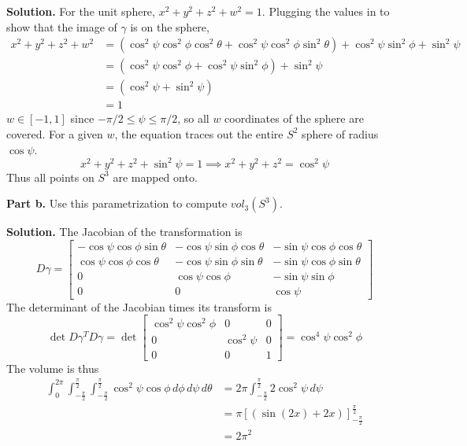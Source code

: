 \documentclass[12pt]{article}
\begin{document}
\textbf{Solution.}
  For the unit sphere, $x^2 + y^2 + z^2 + w^2 = 1$.
  Plugging the values in to show that the image of $\gamma$ is on the sphere, 
  \begin{align*}
    x^2 + y^2 + z^2 + w^2
    &= (\cos^2 \psi \cos^2 \phi \cos^2 \theta + \cos^2 \psi \cos^2 \phi \sin^2 \theta) + \cos^2 \psi \sin^2 \phi + \sin^2 \psi \\
    &= (\cos^2 \psi \cos^2 \phi  + \cos^2 \psi \sin^2 \phi) + \sin^2 \psi \\
    &= (\cos^2 \psi  + \sin^2 \psi) \\
    &= 1
  \end{align*}
   $w \in [-1, 1]$ since $-\pi/2\leq \psi\leq \pi/2$,
  so all $w$ coordinates of the sphere are covered.
  For a given $w$, the equation traces out 
  the entire $S^2$ sphere of radius $\cos \psi$.
  \[
    x^2 + y^2 + z^2 + \sin^2 \psi = 1 
    \implies x^2 + y^2 + z^2 = \cos^2 \psi
  \]
  Thus all points on $S^3$ are mapped onto.
  
\bigskip

\noindent \textbf{Part b.}
Use this parametrization to compute $vol_3(S^3)$.
\medskip

\textbf{Solution.}
The Jacobian of the transformation is 
\[
  D\gamma =
  \begin{bmatrix}
    -\cos \psi \cos \phi \sin \theta & -\cos \psi \sin \phi \cos \theta & -\sin \psi \cos \phi \cos \theta\\
    \cos \psi \cos \phi \cos \theta & -\cos \psi \sin \phi \sin \theta & -\sin \psi \cos \phi \sin \theta\\
    0 & \cos \psi \cos \phi & -\sin \psi \sin \phi\\
    0 & 0 & \cos \psi
  \end{bmatrix}
\]
The determinant of the Jacobian times its transform is 
\[
  \det D\gamma^T D\gamma =
  \det \begin{bmatrix}
    \cos^2 \psi \cos^2 \phi & 0 & 0 \\
    0 & \cos^2 \psi & 0 \\
    0 & 0 & 1
  \end{bmatrix} = 
  \cos^4 \psi \cos^2 \phi
\]
The volume is thus 
\begin{align*}
  \int_{0}^{2\pi}
  \int_{-\frac{\pi}{2}}^{\frac{\pi}{2}} 
  \int_{-\frac{\pi}{2}}^{\frac{\pi}{2}}
  \cos^2 \psi \cos \phi
  \,d\phi \,d\psi \,d\theta
  &= 2\pi
  \int_{-\frac{\pi}{2}}^{\frac{\pi}{2}} 
  2\cos^2 \psi \,d\psi \\
  &= \pi\left[(\sin(2x) + 2x)\right]_{-\frac{\pi}{2}}^{\frac{\pi}{2}} \\
  &= 2\pi^2
\end{align*}
  
\end{document}
